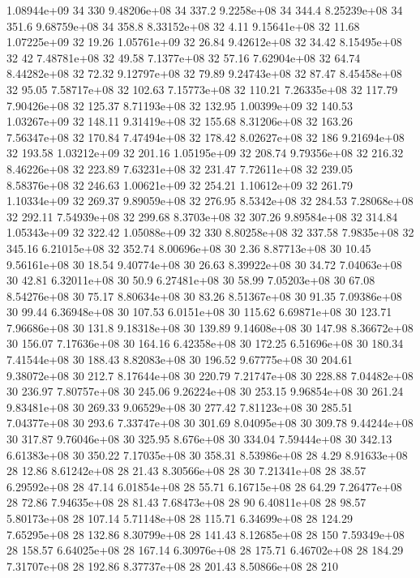 1.08944e+09 34 330
9.48206e+08 34 337.2
9.2258e+08 34 344.4
8.25239e+08 34 351.6
9.68759e+08 34 358.8
8.33152e+08 32 4.11
9.15641e+08 32 11.68
1.07225e+09 32 19.26
1.05761e+09 32 26.84
9.42612e+08 32 34.42
8.15495e+08 32 42
7.48781e+08 32 49.58
7.1377e+08 32 57.16
7.62904e+08 32 64.74
8.44282e+08 32 72.32
9.12797e+08 32 79.89
9.24743e+08 32 87.47
8.45458e+08 32 95.05
7.58717e+08 32 102.63
7.15773e+08 32 110.21
7.26335e+08 32 117.79
7.90426e+08 32 125.37
8.71193e+08 32 132.95
1.00399e+09 32 140.53
1.03267e+09 32 148.11
9.31419e+08 32 155.68
8.31206e+08 32 163.26
7.56347e+08 32 170.84
7.47494e+08 32 178.42
8.02627e+08 32 186
9.21694e+08 32 193.58
1.03212e+09 32 201.16
1.05195e+09 32 208.74
9.79356e+08 32 216.32
8.46226e+08 32 223.89
7.63231e+08 32 231.47
7.72611e+08 32 239.05
8.58376e+08 32 246.63
1.00621e+09 32 254.21
1.10612e+09 32 261.79
1.10334e+09 32 269.37
9.89059e+08 32 276.95
8.5342e+08 32 284.53
7.28068e+08 32 292.11
7.54939e+08 32 299.68
8.3703e+08 32 307.26
9.89584e+08 32 314.84
1.05343e+09 32 322.42
1.05088e+09 32 330
8.80258e+08 32 337.58
7.9835e+08 32 345.16
6.21015e+08 32 352.74
8.00696e+08 30 2.36
8.87713e+08 30 10.45
9.56161e+08 30 18.54
9.40774e+08 30 26.63
8.39922e+08 30 34.72
7.04063e+08 30 42.81
6.32011e+08 30 50.9
6.27481e+08 30 58.99
7.05203e+08 30 67.08
8.54276e+08 30 75.17
8.80634e+08 30 83.26
8.51367e+08 30 91.35
7.09386e+08 30 99.44
6.36948e+08 30 107.53
6.0151e+08 30 115.62
6.69871e+08 30 123.71
7.96686e+08 30 131.8
9.18318e+08 30 139.89
9.14608e+08 30 147.98
8.36672e+08 30 156.07
7.17636e+08 30 164.16
6.42358e+08 30 172.25
6.51696e+08 30 180.34
7.41544e+08 30 188.43
8.82083e+08 30 196.52
9.67775e+08 30 204.61
9.38072e+08 30 212.7
8.17644e+08 30 220.79
7.21747e+08 30 228.88
7.04482e+08 30 236.97
7.80757e+08 30 245.06
9.26224e+08 30 253.15
9.96854e+08 30 261.24
9.83481e+08 30 269.33
9.06529e+08 30 277.42
7.81123e+08 30 285.51
7.04377e+08 30 293.6
7.33747e+08 30 301.69
8.04095e+08 30 309.78
9.44244e+08 30 317.87
9.76046e+08 30 325.95
8.676e+08 30 334.04
7.59444e+08 30 342.13
6.61383e+08 30 350.22
7.17035e+08 30 358.31
8.53986e+08 28 4.29
8.91633e+08 28 12.86
8.61242e+08 28 21.43
8.30566e+08 28 30
7.21341e+08 28 38.57
6.29592e+08 28 47.14
6.01854e+08 28 55.71
6.16715e+08 28 64.29
7.26477e+08 28 72.86
7.94635e+08 28 81.43
7.68473e+08 28 90
6.40811e+08 28 98.57
5.80173e+08 28 107.14
5.71148e+08 28 115.71
6.34699e+08 28 124.29
7.65295e+08 28 132.86
8.30799e+08 28 141.43
8.12685e+08 28 150
7.59349e+08 28 158.57
6.64025e+08 28 167.14
6.30976e+08 28 175.71
6.46702e+08 28 184.29
7.31707e+08 28 192.86
8.37737e+08 28 201.43
8.50866e+08 28 210
